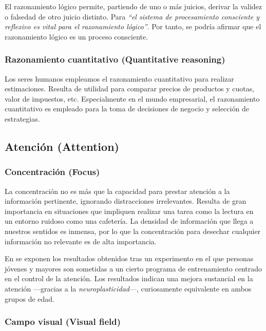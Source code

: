 El razonamiento lógico permite, partiendo de uno o más juicios, derivar la validez o falsedad de otro juicio distinto. Para \cite{DeWall2008} {\it ``el sistema de procesamiento consciente y reflexivo es vital para el razonamiento lógico''}. Por tanto, se podría afirmar que el razonamiento lógico es un proceso consciente.

\subsubsection{Razonamiento cuantitativo (Quantitative reasoning)}

Los seres humanos empleamos el razonamiento cuantitativo para realizar estimaciones. Resulta de utilidad para comparar precios de productos y cuotas, valor de impuestos, etc. Especialmente en el mundo empresarial, el razonamiento cuantitativo es empleado para la toma de decisiones de negocio y selección de estrategias.

\subsection{Atención (Attention)}

\subsubsection{Concentración (Focus)}

La concentración no es más que la capacidad para prestar atención a la información pertinente, ignorando distracciones irrelevantes. Resulta de gran importancia en situaciones que impliquen realizar una tarea como la lectura en un entorno ruidoso como una cafetería. La densidad de información que llega a nuestros sentidos es inmensa, por lo que la concentración para desechar cualquier información no relevante es de alta importancia.

En \cite{Bherer2006} se exponen los resultados obtenidos tras un experimento en el que personas jóvenes y mayores son sometidas a un cierto programa de entrenamiento centrado en el control de la atención. Los resultados indican una mejora sustancial en la atención ---gracias a la {\it neuroplasticidad}---, curiosamente equivalente en ambos grupos de edad.

\subsubsection{Campo visual (Visual field)}

